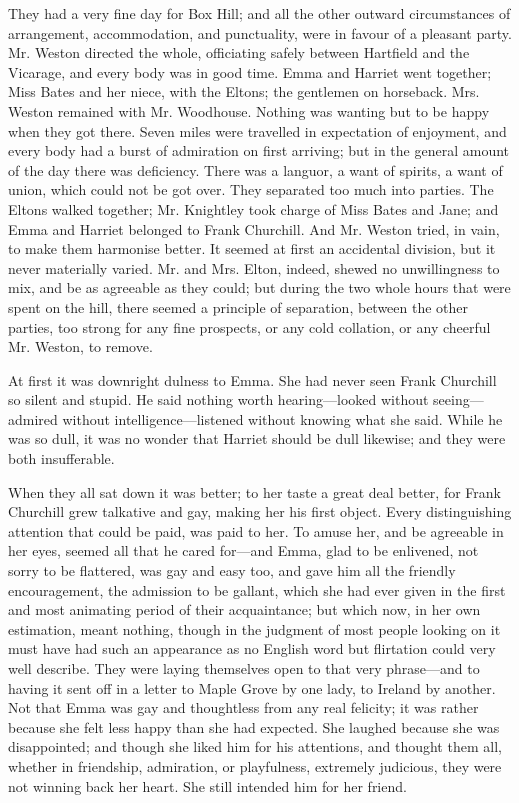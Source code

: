 They had a very fine day for Box Hill; and all the other outward circumstances of arrangement, accommodation, and punctuality, were in favour of a pleasant party. Mr. Weston directed the whole, officiating safely between Hartfield and the Vicarage, and every body was in good time. Emma and Harriet went together; Miss Bates and her niece, with the Eltons; the gentlemen on horseback. Mrs. Weston remained with Mr. Woodhouse. Nothing was wanting but to be happy when they got there. Seven miles were travelled in expectation of enjoyment, and every body had a burst of admiration on first arriving; but in the general amount of the day there was deficiency. There was a languor, a want of spirits, a want of union, which could not be got over. They separated too much into parties. The Eltons walked together; Mr. Knightley took charge of Miss Bates and Jane; and Emma and Harriet belonged to Frank Churchill. And Mr. Weston tried, in vain, to make them harmonise better. It seemed at first an accidental division, but it never materially varied. Mr. and Mrs. Elton, indeed, shewed no unwillingness to mix, and be as agreeable as they could; but during the two whole hours that were spent on the hill, there seemed a principle of separation, between the other parties, too strong for any fine prospects, or any cold collation, or any cheerful Mr. Weston, to remove.

At first it was downright dulness to Emma. She had never seen Frank Churchill so silent and stupid. He said nothing worth hearing---looked without seeing---admired without intelligence---listened without knowing what she said. While he was so dull, it was no wonder that Harriet should be dull likewise; and they were both insufferable.

When they all sat down it was better; to her taste a great deal better, for Frank Churchill grew talkative and gay, making her his first object. Every distinguishing attention that could be paid, was paid to her. To amuse her, and be agreeable in her eyes, seemed all that he cared for---and Emma, glad to be enlivened, not sorry to be flattered, was gay and easy too, and gave him all the friendly encouragement, the admission to be gallant, which she had ever given in the first and most animating period of their acquaintance; but which now, in her own estimation, meant nothing, though in the judgment of most people looking on it must have had such an appearance as no English word but flirtation could very well describe.  They were laying themselves open to that very phrase---and to having it sent off in a letter to Maple Grove by one lady, to Ireland by another. Not that Emma was gay and thoughtless from any real felicity; it was rather because she felt less happy than she had expected. She laughed because she was disappointed; and though she liked him for his attentions, and thought them all, whether in friendship, admiration, or playfulness, extremely judicious, they were not winning back her heart. She still intended him for her friend.

